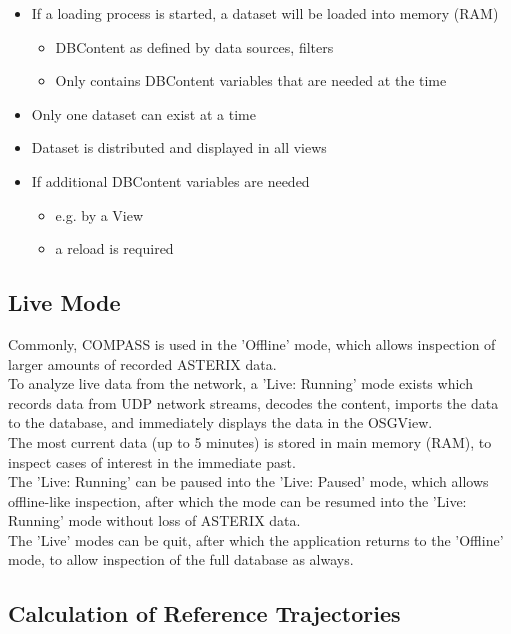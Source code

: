 \begin{itemize}
\item If a loading process is started, a dataset will be loaded into memory (RAM)
\begin{itemize}
\item DBContent as defined by data sources, filters
\item Only contains DBContent variables that are needed at the time
\end{itemize}
\item Only one dataset can exist at a time
\item Dataset is distributed and displayed in all views
\item If additional DBContent variables are needed
\begin{itemize}
\item e.g. by a View
\item a reload is required
\end{itemize}
\end{itemize}

\subsection*{Live Mode}
Commonly, COMPASS is used in the 'Offline' mode, which allows inspection of larger amounts of recorded ASTERIX data. \\

To analyze live data from the network, a 'Live: Running' mode exists which records data from UDP network streams, decodes the content, imports the data to the database, and immediately displays the data in the OSGView. \\

The most current data (up to 5 minutes) is stored in main memory (RAM), to inspect cases of interest in the immediate past. \\

The 'Live: Running' can be paused into the 'Live: Paused' mode, which allows offline-like inspection, after which the mode can be resumed into the 'Live: Running' mode without loss of ASTERIX data. \\

The 'Live' modes can be quit, after which the application returns to the 'Offline' mode, to allow inspection of the full database as always.

\subsection*{Calculation of Reference Trajectories}

